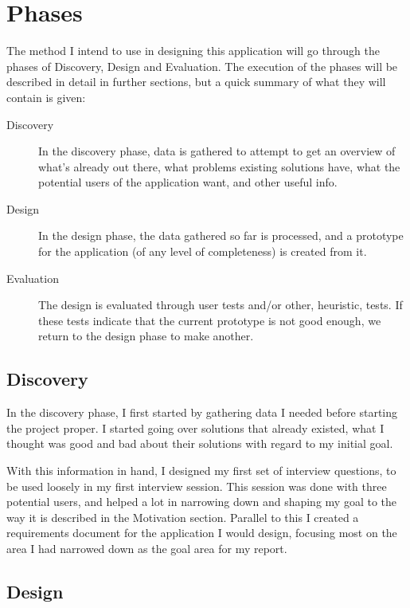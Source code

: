 \documentclass[]{report}
\begin{document}
\section{Phases}

The method I intend to use in designing this application will go through the
phases of Discovery, Design and Evaluation. The execution of the phases will be
described in detail in further sections, but a quick summary of what they will
contain is given:

\begin{description}
\item[Discovery] In the discovery phase, data is gathered to attempt to get an
  overview of what's already out there, what problems existing solutions have,
  what the potential users of the application want, and other useful info.
\item[Design] In the design phase, the data gathered so far is processed, and a
  prototype for the application (of any level of completeness) is created from
  it.
\item[Evaluation] The design is evaluated through user tests and/or other,
  heuristic, tests. If these tests indicate that the current prototype is not
  good enough, we return to the design phase to make another.
\end{description}

\subsection{Discovery}

In the discovery phase, I first started by gathering data I needed before
starting the project proper. I started going over solutions that already
existed, what I thought was good and bad about their solutions with regard to my
initial goal.

With this information in hand, I designed my first set of interview questions,
to be used loosely in my first interview session. This session was done with
three potential users, and helped a lot in narrowing down and shaping my goal
to the way it is described in the Motivation section. Parallel to this I created
a requirements document for the application I would design, focusing most on the
area I had narrowed down as the goal area for my report.

\subsection{Design}
\end{document}

